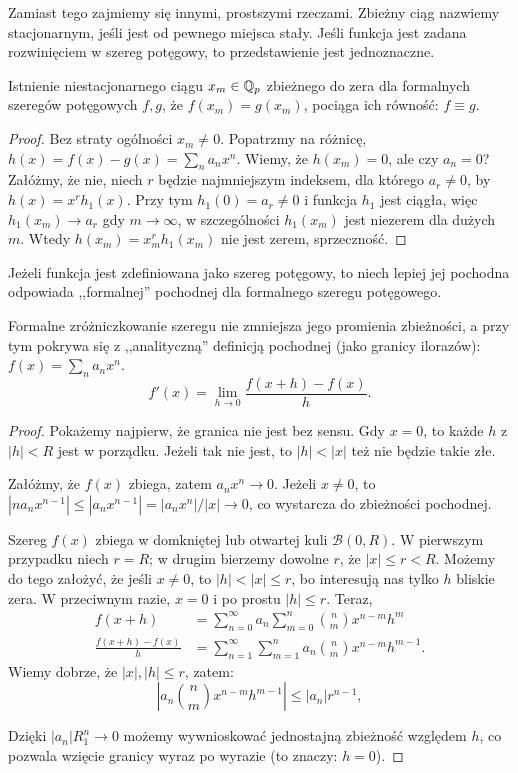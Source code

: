 Zamiast tego zajmiemy się innymi, prostszymi rzeczami.
Zbieżny ciąg nazwiemy {stacjonarnym}, jeśli jest od pewnego miejsca stały.
Jeśli funkcja jest zadana rozwinięciem w szereg potęgowy, to przedstawienie jest jednoznaczne.

\begin{fakt} \label{fratris}
	Istnienie niestacjonarnego ciągu $x_m \in \mathbb Q_p$ zbieżnego do zera dla formalnych szeregów potęgowych $f, g$, że $f(x_m) = g(x_m)$, pociąga ich równość: $f \equiv g$.
\end{fakt}

\begin{proof}
	Bez straty ogólności $x_m \neq 0$.
	Popatrzmy na różnicę, $h(x) = f(x) - g(x) = \sum_n a_nx^n$.
	Wiemy, że $h(x_m) = 0$, ale czy $a_n = 0$?
	Załóżmy, że nie, niech $r$ będzie najmniejszym indeksem, dla którego $a_r \neq 0$, by
	$h(x) = x^r h_1(x)$.
	Przy tym $h_1(0) = a_r \neq 0$ i funkcja $h_1$ jest ciągła, więc $h_1(x_m) \to a_r$ gdy $m \to \infty$, w szczególności $h_1(x_m)$ jest niezerem dla dużych $m$.
Wtedy $h(x_m) = x_m^r h_1(x_m)$ nie jest zerem, sprzeczność.
\end{proof}

Jeżeli funkcja jest zdefiniowana jako szereg potęgowy, to niech lepiej jej pochodna odpowiada ,,formalnej'' pochodnej dla formalnego szeregu potęgowego.

\begin{fakt} \label{maris}
	Formalne zróżniczkowanie szeregu nie zmniejsza jego promienia zbieżności, a przy tym pokrywa się z ,,analityczną'' definicją pochodnej (jako granicy ilorazów): $f(x) = \sum_n a_nx^n$.
	\[
		f'(x) = \lim_{h \to 0} \frac {f(x+h)-f(x)}h.
	\]
\end{fakt}

\begin{proof}
	Pokażemy najpierw, że granica nie jest bez sensu.
	Gdy $x = 0$, to każde $h$ z $|h| < R $ jest w porządku. 
	Jeżeli tak nie jest, to $|h| < |x|$ też nie będzie takie złe.

	Załóżmy, że $f(x)$ zbiega, zatem $a_n x^n \to 0$.
	Jeżeli $x \neq 0$, to $|na_nx^{n-1}| \le |a_nx^{n-1}| = |a_nx^n|/|x| \to 0$, co wystarcza do zbieżności pochodnej.

	Szereg $f(x)$ zbiega w domkniętej lub otwartej kuli $\mathcal B(0, R )$.
	W pierwszym przypadku niech $r = R $; w drugim bierzemy dowolne $r$, że $|x| \le r < R $.
	Możemy do tego założyć, że jeśli $x \neq 0$, to $|h| < |x| \le r$, bo interesują nas tylko $h$ bliskie zera.
	W przeciwnym razie, $x = 0$ i po prostu $|h| \le r$.
	Teraz,
	\begin{align*}
		f(x+h)                  & = \sum_{n = 0}^\infty a_n \sum_{m = 0}^n {n \choose m} x^{n-m} h^m \\
		\frac{f(x+h) - f(x)}{h} & = \sum_{n = 1}^\infty \sum_{m = 1}^n a_n {n \choose m} x^{n-m} h^{m-1}.
		\end{align*}
	Wiemy dobrze, że $|x|, |h| \le r$, zatem:
	\[
		\left| a_n {n \choose m} x^{n-m} h^{m-1} \right| \le |a_n| r^{n-1},
	\]

	Dzięki $|a_n|R _1^n \to 0$ możemy wywnioskować jednostajną zbieżność względem $h$, co pozwala wzięcie granicy wyraz po wyrazie (to znaczy: $h = 0$).
\end{proof}

